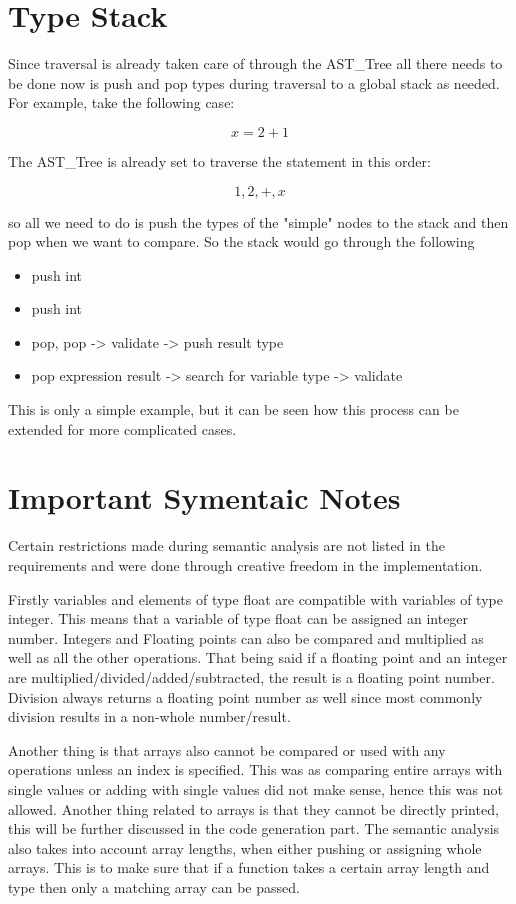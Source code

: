 \documentclass[12pt, a4paper]{report}
\begin{document}
\section{Type Stack}
Since traversal is already taken care of through the AST\_Tree all there needs to be done now is push and pop types during traversal to a global stack as needed. For example, take the following case:

$$x = 2+1$$

The AST\_Tree is already set to traverse the statement in this order: 

$$1, 2, +, x$$

so all we need to do is push the types of the "simple" nodes to the stack and then pop when we want to compare. So the stack would go through the following
\begin{itemize}
    \item push int
    \item push int
    \item pop, pop -> validate -> push result type
    \item pop expression result -> search for variable type -> validate
\end{itemize}


This is only a simple example, but it can be seen how this process can be extended for more complicated cases.

\section{Important Symentaic Notes}
Certain restrictions made during semantic analysis are not listed in the requirements and were done through creative freedom in the implementation.

Firstly variables and elements of type float are compatible with variables of type integer. This means that a variable of type float can be assigned an integer number. Integers and Floating points can also be compared and multiplied as well as all the other operations. That being said if a floating point and an integer are multiplied/divided/added/subtracted, the result is a floating point number. Division always returns a floating point number as well since most commonly division results in a non-whole number/result.

Another thing is that arrays also cannot be compared or used with any operations unless an index is specified. This was as comparing entire arrays with single values or adding with single values did not make sense, hence this was not allowed. Another thing related to arrays is that they cannot be directly printed, this will be further discussed in the code generation part. The semantic analysis also takes into account array lengths, when either pushing or assigning whole arrays. This is to make sure that if a function takes a certain array length and type then only a matching array can be passed. 
\end{document}
